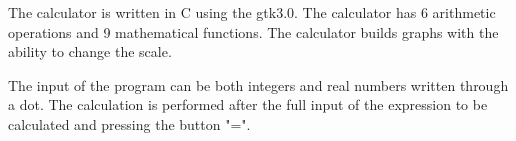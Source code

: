 \documentclass{article}
\def\header#1#2{\par\vspace{11pt}{\ifcase#1\or\huge\or\Large\or\large\or\normalsize\or\small\fi \bfseries #2}\vspace{11pt}\par}
\begin{document}
\header2{Documentation for SmartCalc-v1.0}

The calculator is written in C using the gtk3.0. The calculator has 6 arithmetic operations and 9 mathematical functions. The calculator builds graphs with the ability to change the scale.

The input of the program can be both integers and real numbers written through a dot. The calculation is performed after the full input of the expression to be calculated and pressing the button "=".
\end{document}
